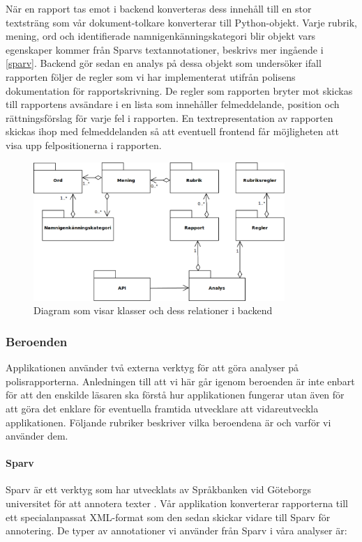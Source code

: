\documentclass[swedish]{maucsthesis}
\begin{document}
När en rapport tas emot i backend konverteras dess innehåll till en stor
textsträng som vår dokument-tolkare konverterar till Python-objekt. Varje
rubrik, mening, ord och identifierade namnigenkänningskategori blir objekt
vars egenskaper kommer från Sparvs textannotationer, beskrivs mer ingående i \cref{sparv}. Backend gör sedan en analys
på dessa objekt som undersöker ifall rapporten följer de regler som vi har
implementerat utifrån polisens dokumentation för rapportskrivning. De regler som
rapporten bryter mot skickas till rapportens avsändare i en lista som innehåller
felmeddelande, position och rättningsförslag för varje fel i rapporten. En
textrepresentation av rapporten skickas ihop med felmeddelanden så att eventuell
frontend får möjligheten att visa upp felpositionerna i rapporten.

\begin{figure}[H]
    \centering
    \includegraphics[width=0.85\textwidth]{backendklasser}
    \caption{Diagram som visar klasser och dess relationer i backend}
    \label{fig:erdbackend}
\end{figure}

\subsubsection{Beroenden}

Applikationen använder två externa verktyg för att göra analyser på
polisrapporterna. Anledningen till att vi här går igenom beroenden är inte
enbart för att den enskilde läsaren ska förstå hur applikationen fungerar utan
även för att göra det enklare för eventuella framtida utvecklare att
vidareutveckla applikationen. Följande rubriker beskriver vilka beroendena är
och varför vi använder dem.

\paragraph*{Sparv}\label{sparv}
Sparv \cite{sprakbanken:2019} är ett verktyg som har utvecklats av Språkbanken vid Göteborgs universitet
för att annotera texter \cite{borin:2016}. Vår applikation konverterar rapporterna till ett
specialanpassat XML-format som den sedan skickar vidare till Sparv för
annotering. De typer av annotationer vi använder från Sparv i våra analyser är:
\end{document}
